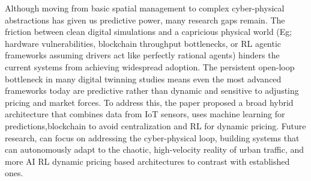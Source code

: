 \documentclass[conference]{IEEEtran}
\begin{document}
Although moving from basic spatial management to complex cyber-physical abstractions has given us predictive power, many research gaps remain. The friction between clean digital simulations and a capricious physical world (Eg; hardware vulnerabilities, blockchain throughput bottlenecks, or RL agentic frameworks assuming drivers act like perfectly rational agents) hinders the current systems from achieving widespread adoption. The persistent open-loop bottleneck in many digital twinning studies means even the most advanced frameworks today are predictive rather than dynamic and sensitive to adjusting pricing and market forces. To address this, the paper proposed a broad hybrid architecture that combines data from IoT sensors, uses machine learning for predictions,blockchain to avoid centralization and RL for dynamic pricing. Future research, can focus on addressing the cyber-physical loop, building systems that can autonomously adapt to the chaotic, high-velocity reality of urban traffic, and more AI RL dynamic pricing based architectures to contrast with established ones.
\end{document}
